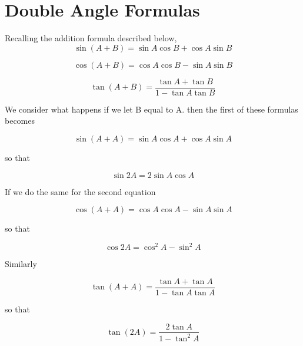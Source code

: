 \section{Double Angle Formulas}
\begin{minipage}{0.7\textwidth}
\begin{framed}
  Recalling the addition formula described below,
  \begin{equation*}
    \sin (A + B) = \sin A \cos B + \cos A \sin B
  \end{equation*}

  \begin{equation*}
    \cos (A + B) = \cos A \cos B - \sin A \sin B
  \end{equation*}

  \begin{equation*}
    \tan (A + B) = \frac{\tan A + \tan B}{1 - \tan A \tan B}
  \end{equation*}

  We consider what happens if we let B equal to A. then the first of these
  formulas becomes

  \begin{equation*}
    \sin (A + A) = \sin A \cos A + \cos A \sin A
  \end{equation*}

  so that

  \begin{equation*}
    \sin 2A = 2\sin A \cos A
  \end{equation*}

  If we do the same for the second equation

  \begin{equation*}
    \cos (A + A) = \cos A \cos A - \sin A \sin A
  \end{equation*}

  so that

  \begin{equation*}
    \cos 2A = \cos^2A - \sin^2A
  \end{equation*}

  Similarly

  \begin{equation*}
    \tan (A+A) = \frac{\tan A + \tan A}{1 - \tan A \tan A}
  \end{equation*}

  so that

  \begin{equation*}
    \tan (2A) = \frac{2\tan A}{1 - \tan^2A}
  \end{equation*}
\vspace{0.5cm}
\end{framed}
\end{minipage}

